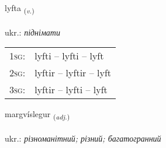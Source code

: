 \documentclass[frontgrid, backgrid]{flacards}\usepackage[]{graphicx}\usepackage[]{xcolor}
\begin{document}
\renewcommand{\flhead}{\vskip5pt \fboxsep=0pt {\small\bfseries\footnotesize Sagnorð | дієслово}}
\renewcommand{\fcfoot}{\vskip5pt \fboxsep=0pt \hspace{2pt}{\small\bfseries\footnotesize 2K}}

\renewcommand{\blhead}{\vskip5pt {\small\bfseries\footnotesize Sagnorð | дієслово }}
\renewcommand{\bcfoot}{\vskip5pt \hspace{2pt}{\small\bfseries\footnotesize 2K}}


{lyfta \small{\textsubscript{(\textit{v.})}} \\[1ex] %
\textphonetic{[lɪfta]} \\
ukr.: \emph{піднімати} \\  [2ex]
\renewcommand*{\arraystretch}{0.8}
\begin{tabular}{p{1cm}l}
\textsc{1sg}: & lyfti -- lyfti -- lyft \\ 
\textsc{2sg}: & lyftir -- lyftir -- lyft \\ 
\textsc{3sg}: & lyftir -- lyfti -- lyft \\ 
\end{tabular}
}

\renewcommand{\flhead}{\vskip5pt \fboxsep=0pt {\small\bfseries\footnotesize Lýsingarorð | прикметник}}
\renewcommand{\fcfoot}{\vskip5pt \fboxsep=0pt \hspace{2pt}{\small\bfseries\footnotesize 2K}}

\renewcommand{\blhead}{\vskip5pt {\small\bfseries\footnotesize Lýsingarorð | прикметник }}
\renewcommand{\bcfoot}{\vskip5pt \hspace{2pt}{\small\bfseries\footnotesize 2K}}


{margvíslegur \small{\textsubscript{(\textit{adj.})}} \\[1ex] %
\textphonetic{[markvistlɛɣʏr]} \\
ukr.: \emph{різноманітний; різний; багатогранний} \\  [2ex]
\renewcommand*{\arraystretch}{0.8}
}
\end{document}
